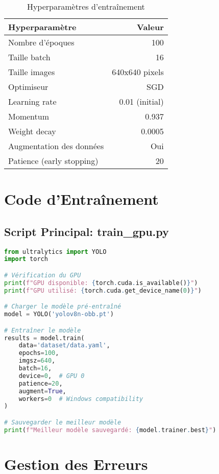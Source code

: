 \documentclass[a4paper,12pt]{report}
\begin{document}
\begin{table}[H]
    \centering
    \begin{tabular}{|l|r|}
    \hline
    \textbf{Hyperparamètre} & \textbf{Valeur} \\
    \hline
    Nombre d'époques & 100 \\
    \hline
    Taille batch & 16 \\
    \hline
    Taille images & 640x640 pixels \\
    \hline
    Optimiseur & SGD \\
    \hline
    Learning rate & 0.01 (initial) \\
    \hline
    Momentum & 0.937 \\
    \hline
    Weight decay & 0.0005 \\
    \hline
    Augmentation des données & Oui \\
    \hline
    Patience (early stopping) & 20 \\
    \hline
    \end{tabular}
    \caption{Hyperparamètres d'entraînement}
\end{table}

\section{Code d'Entraînement}

\subsection{Script Principal: train\_gpu.py}

\begin{lstlisting}[language=Python]
from ultralytics import YOLO
import torch

# Vérification du GPU
print(f"GPU disponible: {torch.cuda.is_available()}")
print(f"GPU utilisé: {torch.cuda.get_device_name(0)}")

# Charger le modèle pré-entraîné
model = YOLO('yolov8n-obb.pt')

# Entraîner le modèle
results = model.train(
    data='dataset/data.yaml',
    epochs=100,
    imgsz=640,
    batch=16,
    device=0,  # GPU 0
    patience=20,
    augment=True,
    workers=0  # Windows compatibility
)

# Sauvegarder le meilleur modèle
print(f"Meilleur modèle sauvegardé: {model.trainer.best}")
\end{lstlisting}

\section{Gestion des Erreurs}
\end{document}
